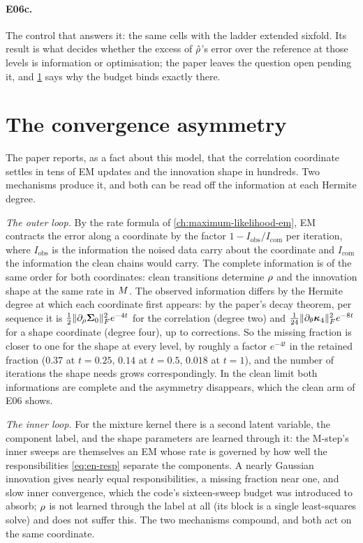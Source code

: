 \paragraph{E06c.} The control that answers it: the same cells with the ladder
extended sixfold. Its result is what decides whether the excess of $\hat{\rho}$'s error
over the reference at those levels is information or optimisation; the paper leaves
the question open pending it, and \cref{sec:en-asymmetry} says why the budget binds
exactly there.

\section{The convergence asymmetry}
\label{sec:en-asymmetry}

The paper reports, as a fact about this model, that the correlation coordinate
settles in tens of EM updates and the innovation shape in hundreds. Two mechanisms
produce it, and both can be read off the information at each Hermite degree.

\emph{The outer loop.} By the rate formula of \cref{ch:maximum-likelihood-em}, EM
contracts the error along a coordinate by the factor
$1-I_{\mathrm{obs}}/I_{\mathrm{com}}$ per iteration, where $I_{\mathrm{obs}}$ is the
information the noised data carry about the coordinate and $I_{\mathrm{com}}$ the
information the clean chains would carry. The complete information is of the same
order for both coordinates: clean transitions determine $\rho$ and the innovation
shape at the same rate in $M$. The observed information differs by the Hermite
degree at which each coordinate first appears: by the paper's decay theorem, per sequence
it is $\tfrac12\lVert \partial_\rho\mathbf{\Sigma}_0 \rVert_{F}^2e^{-4t}$ for the correlation (degree two) and
$\tfrac1{24}\lVert \partial_\theta\bm{\kappa}_4 \rVert_{F}^2e^{-8t}$ for a shape coordinate (degree four), up
to corrections. So the missing fraction is closer to one for the shape at every level,
by roughly a factor $e^{-4t}$ in the retained fraction ($0.37$ at $t=0.25$, $0.14$ at
$t=0.5$, $0.018$ at $t=1$), and the number of iterations the shape needs grows
correspondingly. In the clean limit both informations are complete and the asymmetry
disappears, which the clean arm of E06 shows.

\emph{The inner loop.} For the mixture kernel there is a second latent variable, the
component label, and the shape parameters are learned through it: the M-step's inner
sweeps are themselves an EM whose rate is governed by how well the responsibilities
\cref{eq:en-resp} separate the components. A nearly Gaussian innovation gives nearly
equal responsibilities, a missing fraction near one, and slow inner convergence,
which the code's sixteen-sweep budget was introduced to absorb; $\rho$ is not learned
through the label at all (its block is a single least-squares solve) and does not
suffer this. The two mechanisms compound, and both act on the same coordinate.

